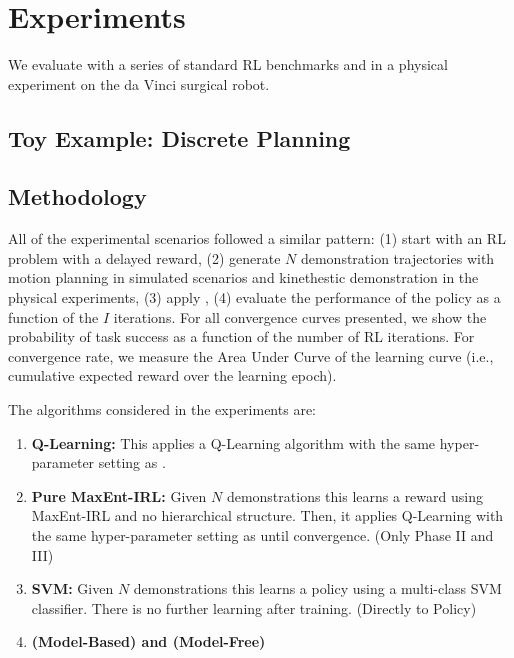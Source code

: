 %

\section{Experiments}\label{sec:exp}
We evaluate \hirl with a series of standard RL benchmarks and in a physical experiment on the da Vinci surgical robot.


\subsection{Toy Example: Discrete Planning}









\subsection{Methodology}
All of the experimental scenarios followed a similar pattern: (1) start with an RL problem with a delayed reward, (2) generate $N$ demonstration trajectories with motion planning in simulated scenarios and kinethestic demonstration in the physical experiments, (3) apply \hirl, (4) evaluate the performance of the policy as a function of the $I$ iterations.
For all convergence curves presented, we show the probability of task success as a function of the number of RL iterations.
For convergence rate, we measure the Area Under Curve of the learning curve (i.e., cumulative expected reward over the learning epoch).

\noindent The algorithms considered in the experiments are:
\begin{enumerate}[
    topsep=0pt,
    noitemsep,
    leftmargin=*,
    ]
    \item \textbf{Q-Learning: } This applies a Q-Learning algorithm with the same hyper-parameter setting as \hirl. 
    \item \textbf{Pure MaxEnt-IRL: } Given $N$ demonstrations this learns a reward using MaxEnt-IRL and no hierarchical structure. Then, it applies Q-Learning with the same hyper-parameter setting as \hirl until convergence. (Only Phase II and III)
    \item \textbf{SVM: } Given $N$ demonstrations this learns a policy using a multi-class SVM classifier. There is no further learning after training. (Directly to Policy)
    \item \textbf{\HIRL (Model-Based) and \HIRL (Model-Free)} 
\end{enumerate}

